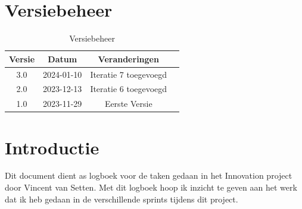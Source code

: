 \documentclass[a4paper]{report}
\begin{document}
\tableofcontents

\chapter{Versiebeheer}
\begin{table}[h]
    \centering
    \begin{tabular}{|c|c|c|p{5cm}|}
        \hline
        \textbf{Versie} & \textbf{Datum} & \textbf{Veranderingen}  \\
        \hline
        3.0   & 2024-01-10 & Iteratie 7 toegevoegd \\
        \hline
        2.0   & 2023-12-13 & Iteratie 6 toegevoegd \\
        \hline
        1.0   & 2023-11-29 & Eerste Versie \\
        \hline

    \end{tabular}
    \caption{Versiebeheer}
\end{table}


\chapter{Introductie}
Dit document dient as logboek voor de taken gedaan in het Innovation project door Vincent van Setten.
Met dit logboek hoop ik inzicht te geven aan het werk dat ik heb gedaan in de verschillende sprints tijdens dit project.


\vspace{1.5cm}




    
\end{document}
